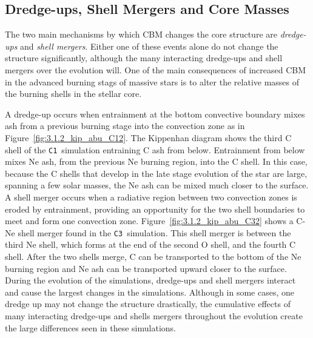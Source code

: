 \documentclass[useAMS,usenatbib]{mn2e}
\newcommand{\Ca}{\textsc{\texttt{C1}}}
\newcommand{\Cc}{\textsc{\texttt{C3}}}
\begin{document}
\subsection{Dredge-ups, Shell Mergers and Core Masses}\label{sec:Dups}

The two main mechanisms by which CBM changes the core structure are
\textit{dredge-ups} and \textit{shell mergers}. Either one of these events
alone do not change the structure significantly, although the many
interacting dredge-ups and shell mergers over the evolution will. One of the
main consequences of increased CBM in the advanced burning stags of massive stars is to alter the relative masses of the burning shells in the stellar core.

A dredge-up occurs when entrainment at the bottom convective boundary mixes ash from a previous burning stage into the convection zone as in Figure~\ref{fig:3.1.2_kip_abu_C12}. The Kippenhan diagram shows the third C shell of the \Ca\ simulation entraining C ash from below. Entrainment from below mixes Ne ash, from the previous Ne burning region, into the C shell. In this case, because the C shells that develop in the late stage evolution of the star are large, spanning a few solar masses, the Ne ash can be mixed much closer to the surface. A shell merger occurs when a radiative region between two convection zones is eroded by entrainment, providing an opportunity for the two shell boundaries to meet and form one convection zone. Figure~\ref{fig:3.1.2_kip_abu_C32} shows a C-Ne shell merger found in the \Cc\ simulation. This shell merger is between the third Ne shell, which forms at the end of the second O shell, and the fourth C shell. After the two shells merge, C can be transported to the bottom of the Ne burning region and Ne ash can be transported upward closer to the surface. During the evolution of the simulations, dredge-ups and shell mergers interact and cause the largest changes in the simulations. Although in some cases, one dredge up may not change the structure drastically, the cumulative effects of many interacting dredge-ups and shells mergers throughout the evolution create the large differences seen in these simulations.
\end{document}
